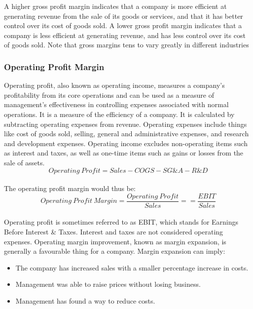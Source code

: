 \documentclass{article}
\begin{document}
A higher gross profit margin indicates that a company is more efficient at generating revenue from the sale of its goods or services, and that it has better control over its cost of goods sold. A lower gross profit margin indicates that a company is less efficient at generating revenue, and has less control over its cost of goods sold. Note that gross margins tens to vary greatly in different industries

\subsubsection{Operating Profit Margin}
Operating profit, also known as operating income, measures a company's profitability from its core operations and can be used as a measure of management's effectiveness in controlling expenses associated with normal operations. It is a measure of the efficiency of a company. It is calculated by subtracting operating expenses from revenue. Operating expenses include things like cost of goods sold, selling, general and administrative expenses, and research and development expenses. Operating income excludes non-operating items such as interest and taxes, as well as one-time items such as gains or losses from the sale of assets.
\begin{equation}
    Operating\: Profit = Sales - COGS - SG\&A - R\&D
\end{equation}\\

The operating profit margin would thus be:
\begin{equation}
    Operating\:Profit\:Margin = \frac{Operating\:Profit}{Sales} == \frac{EBIT}{Sales}
\end{equation}\\

Operating profit is sometimes referred to as EBIT, which stands for Earnings Before Interest \& Taxes. Interest and taxes are not considered operating expenses. Operating margin improvement, known as margin expansion, is generally a favourable thing for a company. Margin expansion can imply:
\begin{itemize}
\item The company has increased sales with a smaller percentage increase in costs.
\item Management was able to raise prices without losing business.
\item Management has found a way to reduce costs.
\end{itemize}
\end{document}
